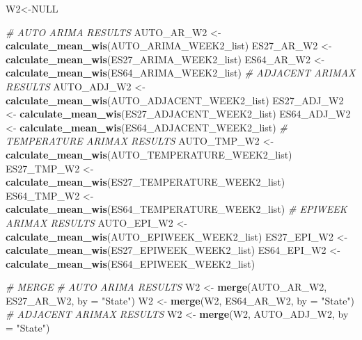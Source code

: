 \documentclass[
]{article}
\newenvironment{Shaded}{\begin{snugshade}}{\end{snugshade}}
\newcommand{\AttributeTok}[1]{\textcolor[rgb]{0.13,0.29,0.53}{#1}}
\newcommand{\CommentTok}[1]{\textcolor[rgb]{0.56,0.35,0.01}{\textit{#1}}}
\newcommand{\ConstantTok}[1]{\textcolor[rgb]{0.56,0.35,0.01}{#1}}
\newcommand{\FunctionTok}[1]{\textcolor[rgb]{0.13,0.29,0.53}{\textbf{#1}}}
\newcommand{\NormalTok}[1]{#1}
\newcommand{\OtherTok}[1]{\textcolor[rgb]{0.56,0.35,0.01}{#1}}
\newcommand{\StringTok}[1]{\textcolor[rgb]{0.31,0.60,0.02}{#1}}
\begin{document}
\begin{Shaded}
\begin{Highlighting}[]
\NormalTok{W2}\OtherTok{\textless{}{-}}\ConstantTok{NULL}

\CommentTok{\# AUTO ARIMA RESULTS}
\NormalTok{AUTO\_AR\_W2 }\OtherTok{\textless{}{-}} \FunctionTok{calculate\_mean\_wis}\NormalTok{(AUTO\_ARIMA\_WEEK2\_list)}
\NormalTok{ES27\_AR\_W2 }\OtherTok{\textless{}{-}} \FunctionTok{calculate\_mean\_wis}\NormalTok{(ES27\_ARIMA\_WEEK2\_list)}
\NormalTok{ES64\_AR\_W2 }\OtherTok{\textless{}{-}} \FunctionTok{calculate\_mean\_wis}\NormalTok{(ES64\_ARIMA\_WEEK2\_list)}
\CommentTok{\# ADJACENT ARIMAX RESULTS}
\NormalTok{AUTO\_ADJ\_W2 }\OtherTok{\textless{}{-}} \FunctionTok{calculate\_mean\_wis}\NormalTok{(AUTO\_ADJACENT\_WEEK2\_list)}
\NormalTok{ES27\_ADJ\_W2 }\OtherTok{\textless{}{-}} \FunctionTok{calculate\_mean\_wis}\NormalTok{(ES27\_ADJACENT\_WEEK2\_list)}
\NormalTok{ES64\_ADJ\_W2 }\OtherTok{\textless{}{-}} \FunctionTok{calculate\_mean\_wis}\NormalTok{(ES64\_ADJACENT\_WEEK2\_list)}
\CommentTok{\# TEMPERATURE ARIMAX RESULTS}
\NormalTok{AUTO\_TMP\_W2 }\OtherTok{\textless{}{-}} \FunctionTok{calculate\_mean\_wis}\NormalTok{(AUTO\_TEMPERATURE\_WEEK2\_list)}
\NormalTok{ES27\_TMP\_W2 }\OtherTok{\textless{}{-}} \FunctionTok{calculate\_mean\_wis}\NormalTok{(ES27\_TEMPERATURE\_WEEK2\_list)}
\NormalTok{ES64\_TMP\_W2 }\OtherTok{\textless{}{-}} \FunctionTok{calculate\_mean\_wis}\NormalTok{(ES64\_TEMPERATURE\_WEEK2\_list)}
\CommentTok{\# EPIWEEK ARIMAX RESULTS}
\NormalTok{AUTO\_EPI\_W2 }\OtherTok{\textless{}{-}} \FunctionTok{calculate\_mean\_wis}\NormalTok{(AUTO\_EPIWEEK\_WEEK2\_list)}
\NormalTok{ES27\_EPI\_W2 }\OtherTok{\textless{}{-}} \FunctionTok{calculate\_mean\_wis}\NormalTok{(ES27\_EPIWEEK\_WEEK2\_list)}
\NormalTok{ES64\_EPI\_W2 }\OtherTok{\textless{}{-}} \FunctionTok{calculate\_mean\_wis}\NormalTok{(ES64\_EPIWEEK\_WEEK2\_list)}

\CommentTok{\# MERGE}
\CommentTok{\# AUTO ARIMA RESULTS}
\NormalTok{W2 }\OtherTok{\textless{}{-}} \FunctionTok{merge}\NormalTok{(AUTO\_AR\_W2, ES27\_AR\_W2, }\AttributeTok{by =} \StringTok{"State"}\NormalTok{)}
\NormalTok{W2 }\OtherTok{\textless{}{-}} \FunctionTok{merge}\NormalTok{(W2, ES64\_AR\_W2, }\AttributeTok{by =} \StringTok{"State"}\NormalTok{)}
\CommentTok{\# ADJACENT ARIMAX RESULTS}
\NormalTok{W2 }\OtherTok{\textless{}{-}} \FunctionTok{merge}\NormalTok{(W2, AUTO\_ADJ\_W2, }\AttributeTok{by =} \StringTok{"State"}\NormalTok{)}
\end{Highlighting}
\end{Shaded}
\end{document}

